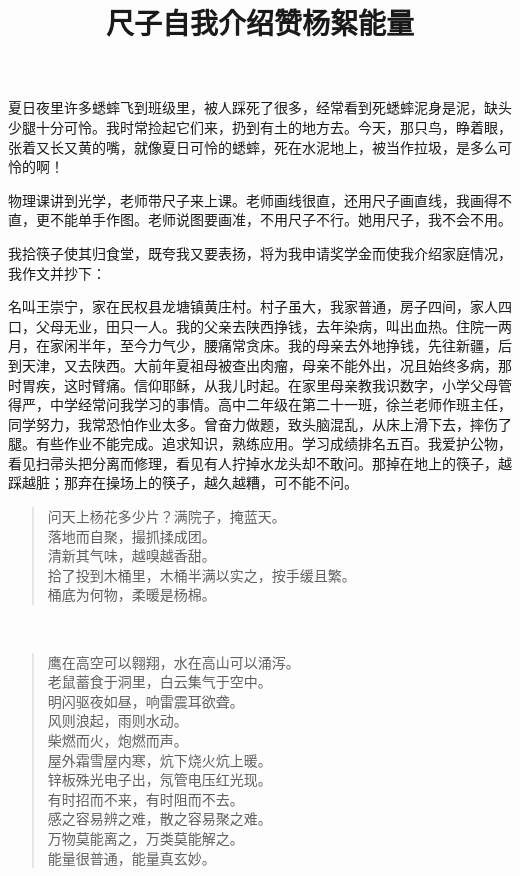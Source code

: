 \documentclass{article}
\begin{document}
夏日夜里许多蟋蟀飞到班级里，被人踩死了很多，经常看到死蟋蟀泥身是泥，缺头少腿十分可怜。我时常捡起它们来，扔到有土的地方去。今天，那只鸟，睁着眼，张着又长又黄的嘴，就像夏日可怜的蟋蟀，死在水泥地上，被当作拉圾，是多么可怜的啊！
\title{尺子}
物理课讲到光学，老师带尺子来上课。老师画线很直，还用尺子画直线，我画得不直，更不能单手作图。老师说图要画准，不用尺子不行。她用尺子，我不会不用。
\title{自我介绍}
\small 我拾筷子使其归食堂，既夸我又要表扬，将为我申请奖学金而使我介绍家庭情况，我作文并抄下：
\normalsize\par
名叫王崇宁，家在民权县龙塘镇黄庄村。村子虽大，我家普通，房子四间，家人四口，父母无业，田只一人。我的父亲去陕西挣钱，去年染病，叫出血热。住院一两月，在家闲半年，至今力气少，腰痛常贪床。我的母亲去外地挣钱，先往新疆，后到天津，又去陕西。大前年夏祖母被查出肉瘤，母亲不能外出，况且始终多病，那时胃疾，这时臂痛。信仰耶稣，从我儿时起。在家里母亲教我识数字，小学父母管得严，中学经常问我学习的事情。高中二年级在第二十一班，徐兰老师作班主任，同学努力，我常恐怕作业太多。曾奋力做题，致头脑混乱，从床上滑下去，摔伤了腿。有些作业不能完成。追求知识，熟练应用。学习成绩排名五百。我爱护公物，看见扫帚头把分离而修理，看见有人拧掉水龙头却不敢问。那掉在地上的筷子，越踩越脏；那弃在操场上的筷子，越久越糟，可不能不问。
\title{赞杨絮}
\begin{verse}
问天上杨花多少片？满院子，掩蓝天。\\
落地而自聚，撮抓揉成团。\\
清新其气味，越嗅越香甜。\\
拾了投到木桶里，木桶半满以实之，按手缓且繁。\\
桶底为何物，柔暖是杨棉。\\
\end{verse}　　　　
\title{能量}
\begin{verse}
鹰在高空可以翱翔，水在高山可以涌泻。\\
老鼠蓄食于洞里，白云集气于空中。\\
明闪驱夜如昼，响雷震耳欲聋。\\
风则浪起，雨则水动。\\
柴燃而火，炮燃而声。\\
屋外霜雪屋内寒，炕下烧火炕上暖。\\
锌板殊光电子出，氖管电压红光现。\\
有时招而不来，有时阻而不去。\\
感之容易辨之难，散之容易聚之难。\\
万物莫能离之，万类莫能解之。\\
能量很普通，能量真玄妙。\\
\end{verse}
\end{document}
